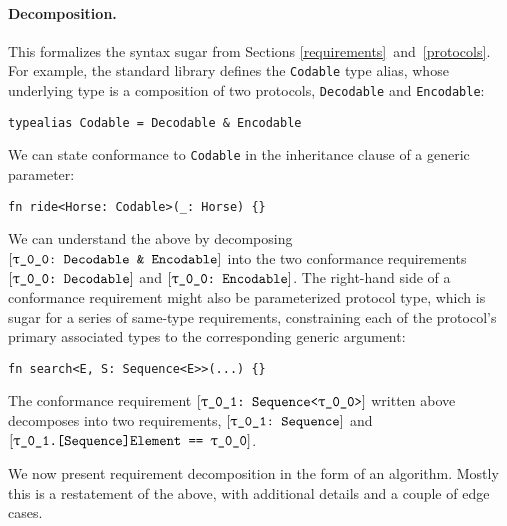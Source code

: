 \documentclass[../generics]{subfiles}
\begin{document}
\paragraph{Decomposition.} This formalizes the syntax sugar from Sections \ref{requirements}~and~\ref{protocols}. For example, the standard library defines the \texttt{Codable} type alias, whose underlying type is a composition of two protocols, \texttt{Decodable} and \texttt{Encodable}:
\begin{Verbatim}
typealias Codable = Decodable & Encodable
\end{Verbatim}
We can state conformance to \texttt{Codable} in the inheritance clause of a generic parameter:
\begin{Verbatim}
fn ride<Horse: Codable>(_: Horse) {}
\end{Verbatim}
We can understand the above by decomposing $\ConfReq{\rT}{Decodable \& Encodable}$ into the two conformance requirements $\ConfReq{\rT}{Decodable}$ and $\ConfReq{\rT}{Encodable}$. The right-hand side of a conformance requirement might also be parameterized protocol type, which is sugar for a series of same-type requirements, constraining each of the protocol's primary associated types to the corresponding generic argument:
\begin{Verbatim}
fn search<E, S: Sequence<E>>(...) {}
\end{Verbatim}
The conformance requirement $\ConfReq{\rU}{Sequence<\rT>}$ written above decomposes into two requirements, $\rUSequence$ and $\SameReq{\rU.[Sequence]Element}{\rT}$.

We now present requirement decomposition in the form of an algorithm. Mostly this is a restatement of the above, with additional details and a couple of edge cases.
\end{document}
